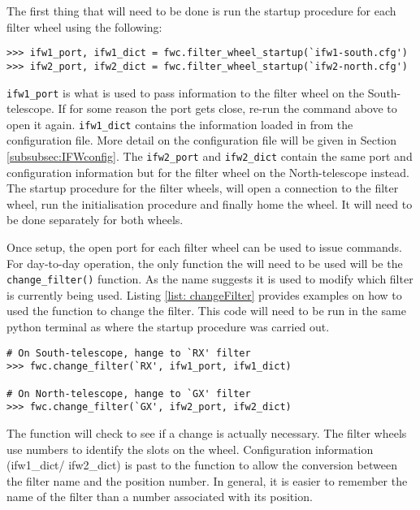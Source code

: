 \documentclass[a4paper,12pt]{article}
\begin{document}
The first thing that will need to be done is run the startup procedure for each filter wheel using the following:
\begin{verbatim}
>>> ifw1_port, ifw1_dict = fwc.filter_wheel_startup(`ifw1-south.cfg')
>>> ifw2_port, ifw2_dict = fwc.filter_wheel_startup(`ifw2-north.cfg')
\end{verbatim}

{\tt ifw1\_port} is what is used to pass information to the filter wheel on the South-telescope. If for some reason the port gets close, re-run the command above to open it again. {\tt ifw1\_dict} contains the information loaded in from the configuration file. More detail on the configuration file will be given in Section \ref{subsubsec:IFWconfig}. The {\tt ifw2\_port} and {\tt ifw2\_dict} contain the same port and configuration information but for the filter wheel on the North-telescope instead. The startup procedure for the filter wheels, will open a connection to the filter wheel, run the initialisation procedure and finally home the wheel. It will need to be done separately for both wheels.


Once setup, the open port for each filter wheel can be used to issue commands. For day-to-day operation, the only function the will need to be used will be the {\tt change\_filter()} function. As the name suggests it is used to modify which filter is currently being used. Listing \ref{list: changeFilter} provides examples on how to used the function to change the filter. This code will need to be run in the same python terminal as where the startup procedure was carried out.
\begin{lstlisting}[caption={Usage example to change the filters}, label={list: changeFilter}]
# On South-telescope, hange to `RX' filter
>>> fwc.change_filter(`RX', ifw1_port, ifw1_dict)

# On North-telescope, hange to `GX' filter
>>> fwc.change_filter(`GX', ifw2_port, ifw2_dict)
\end{lstlisting}
The function will check to see if a change is actually necessary. The filter wheels use numbers to identify the slots on the wheel. Configuration information (ifw1\_dict/ ifw2\_dict) is past to the function to allow the conversion between the filter name and the position number. In general, it is easier to remember the name of the filter than a number associated with its position. 
\end{document}
